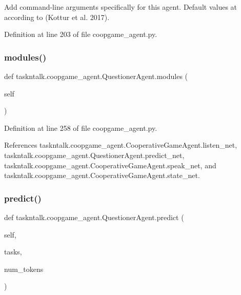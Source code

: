 \begin{DoxyVerb}Add command-line arguments specifically for this agent. Default
values at according to (Kottur et al. 2017).\end{DoxyVerb}
 

Definition at line 203 of file coopgame\+\_\+agent.\+py.

\mbox{\label{classtaskntalk_1_1coopgame__agent_1_1QuestionerAgent_a94ebb3a2a2faadf94a5b89612d104d8a}} 
\subsubsection{\texorpdfstring{modules()}{modules()}}
{\footnotesize\ttfamily def taskntalk.\+coopgame\+\_\+agent.\+Questioner\+Agent.\+modules (\begin{DoxyParamCaption}\item[{}]{self }\end{DoxyParamCaption})}



Definition at line 258 of file coopgame\+\_\+agent.\+py.



References taskntalk.\+coopgame\+\_\+agent.\+Cooperative\+Game\+Agent.\+listen\+\_\+net, taskntalk.\+coopgame\+\_\+agent.\+Questioner\+Agent.\+predict\+\_\+net, taskntalk.\+coopgame\+\_\+agent.\+Cooperative\+Game\+Agent.\+speak\+\_\+net, and taskntalk.\+coopgame\+\_\+agent.\+Cooperative\+Game\+Agent.\+state\+\_\+net.

\mbox{\label{classtaskntalk_1_1coopgame__agent_1_1QuestionerAgent_a46ac14fab9bc4a6b6eeb24f4fe013927}} 
\subsubsection{\texorpdfstring{predict()}{predict()}}
{\footnotesize\ttfamily def taskntalk.\+coopgame\+\_\+agent.\+Questioner\+Agent.\+predict (\begin{DoxyParamCaption}\item[{}]{self,  }\item[{}]{tasks,  }\item[{}]{num\+\_\+tokens }\end{DoxyParamCaption})}

